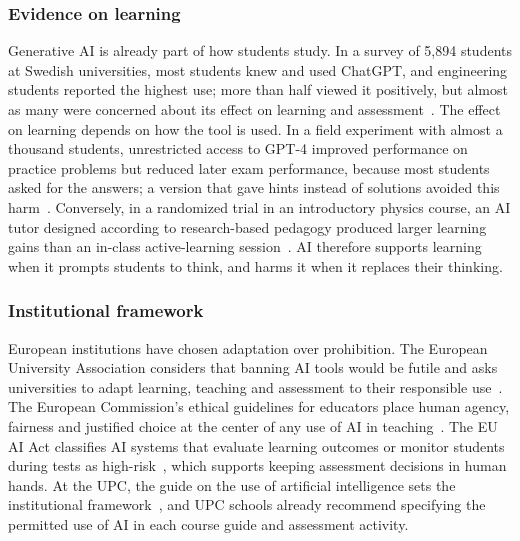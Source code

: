 \documentclass[11pt]{article}
\begin{document}
\subsubsection{Evidence on learning}
Generative AI is already part of how students study. In a survey of
5,894 students at Swedish universities, most students knew and used ChatGPT, and engineering
students reported the highest use; more than half viewed it positively, but almost as many
were concerned about its effect on learning and assessment~\cite{Stohr2024}. The effect on
learning depends on how the tool is used. In a field experiment with almost a thousand
students, unrestricted access to GPT-4 improved performance on practice problems but reduced
later exam performance, because most students asked for the answers; a version that gave
hints instead of solutions avoided this harm~\cite{Bastani2025}. Conversely, in a randomized
trial in an introductory physics course, an AI tutor designed according to research-based
pedagogy produced larger learning gains than an in-class active-learning
session~\cite{Kestin2025}. AI therefore supports learning when it prompts students to think,
and harms it when it replaces their thinking.

\subsubsection{Institutional framework}
European institutions have chosen adaptation over
prohibition. The European University Association considers that banning AI tools would be
futile and asks universities to adapt learning, teaching and assessment to their responsible
use~\cite{EUA2023}. The European Commission's ethical guidelines for educators place human
agency, fairness and justified choice at the center of any use of AI in
teaching~\cite{EC2022}. The EU AI Act classifies AI systems that evaluate learning outcomes
or monitor students during tests as high-risk~\cite{AIAct2024}, which supports keeping
assessment decisions in human hands. At the UPC, the guide on the use of artificial
intelligence sets the institutional framework~\cite{UPCAI2026}, and UPC schools already
recommend specifying the permitted use of AI in each course guide and assessment activity.
\end{document}

